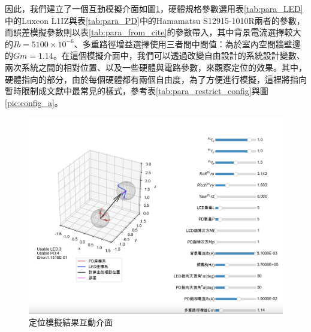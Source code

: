 



因此，我們建立了一個互動模擬介面如圖\ref{pic:result_interactive}，硬體規格參數選用表\ref{tab:para_LED}中的Luxeon L1IZ與表\ref{tab:para_PD}中的Hamamatsu S12915-1010R兩者的參數，而誤差模擬參數則以表\ref{tab:para_from_cite}的參數帶入，其中背景電流選擇較大的$Ib = 5100\times 10^{-6}$、多重路徑增益選擇使用三者間中間值：為於室內空間牆壁邊的$Gm=1.14$。在這個模擬介面中，我們可以透過改變自由設計的系統設計變數、兩次系統之間的相對位置、以及一些硬體與電路參數，來觀察定位的效果。其中，硬體指向的部分，由於每個硬體都有兩個自由度，為了方便進行模擬，這裡將指向暫時限制成文獻中最常見的樣式，參考表\ref{tab:para_restrict_config}與圖\ref{pic:config_a}。



\begin{figure}[htpb]
    \centering
    \includegraphics[width=15cm]{ch4pic/interactive_1to1.png}
    \caption{定位模擬結果互動介面}
    \label{pic:result_interactive}
\end{figure}



